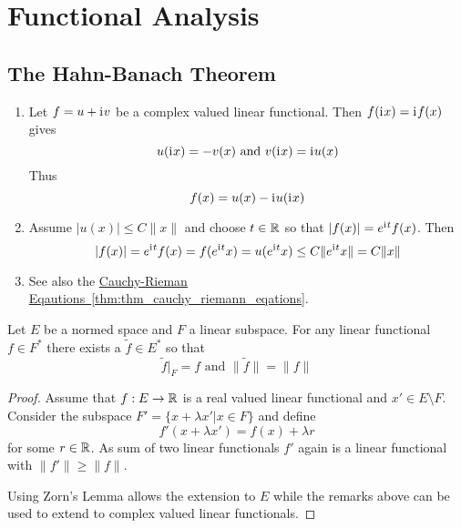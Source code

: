 \newpage
\section{Functional Analysis}

\subsection{The Hahn-Banach Theorem}

\begin{remarks}
    \hfill
    \begin{enumerate}
        \item Let \( f = u + \mathrm{i}\mkern1mu v\) be a complex valued linear functional.
              Then \( f(\mathrm{i}\mkern1mu x) = \mathrm{i}\mkern1mu f(x) \) gives
              \[
                  u(\mathrm{i}\mkern1mu x) = -v(x) \text{ and } v(\mathrm{i}\mkern1mu x) = \mathrm{i}\mkern1mu u(x)
              \]
              Thus
              \[
                  f(x) = u(x) - \mathrm{i}\mkern1mu u(\mathrm{i}\mkern1mu x)
              \]
        \item Assume \( |u(x)| \le C\|x\| \) and choose \( t \in \mathbb{R} \) so that \( |f(x)| = e^{\mathrm{i}\mkern1mu t}f(x) \).
              Then
              \[
                  |f(x)| = e^{\mathrm{i}\mkern1mu t}f(x) = f(e^{\mathrm{i}\mkern1mu t}x) = u(e^{\mathrm{i}\mkern1mu t}x) \le C\|e^{\mathrm{i}\mkern1mu t}x\| = C\|x\|
              \]
        \item
              See also the \hyperref[thm:thm_cauchy_riemann_eqations]{Cauchy-Rieman 
              Eqautions~\ref*{thm:thm_cauchy_riemann_eqations}}.
    \end{enumerate}
\end{remarks}
\bigskip


\begin{theorem}\label{thm:hahn_banach}
    Let \( E \) be a normed space and \( F \) a linear subspace. For any linear functional
    \( f \in F^* \) there exists a \( \tilde{f} \in E^* \) so that
    \[
        \tilde{f}|_F = f \text{ and } \|\tilde{f}\| = \|f\|
    \]
\end{theorem}

\begin{proof}
    Assume that \( f: E \to \mathbb{R} \) is a real valued linear functional and \( x' \in E \setminus F \).
    Consider the subspace \( F' = \{x + \lambda x' | x \in F \} \) and define
    \[
        f'(x + \lambda x') = f(x) + \lambda r
    \]
    for some \( r \in \mathbb{R} \).  As sum of two linear functionals \( f' \) again is a linear functional with
    \( \|f'\| \ge \|f\| \).

    Using Zorn's Lemma allows the extension to \( E \) while the remarks above can be used to extend
    to complex valued linear functionals.
\end{proof}
\bigskip


